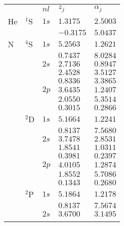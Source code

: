 \begin{table}
\begin{center}
\begin{tabular}{
>{\centering\arraybackslash}p{}
>{\centering\arraybackslash}p{}
>{\centering\arraybackslash}p{}
>{\centering\arraybackslash}p{}
>{\centering\arraybackslash}p{}}
\rowcolor{mydarkgray} 
   &       & $nl$ & $z_j$        & $\alpha_j$   \\
He & $^1$S & $1s$ &  $1.3175$ & $2.5003$  \\\rowcolor{mygray} 
   &       &      & $-0.3175$ & $5.0437$  \\ 
N  & $^4$S & $1s$ & $5.2563$ & $1.2621$  \\\rowcolor{mygray} 
   &       &      & $0.7437$ & $8.0284$  \\ 
   &       & $2s$ & $2.7136$ & $0.8947$ \\\rowcolor{mygray} 
   &       &      & $2.4528$ & $3.5127$  \\
   &       &      & $0.8336$ & $3.3865$  \\ \rowcolor{mygray} 
   &       & $2p$ & $3.6435$ & $1.2407$  \\ 
   &       &      & $2.0550$ & $5.3514$  \\\rowcolor{mygray} 
   &       &      & $0.3015$ & $0.2866$ \\
   & $^2$D & $1s$ & $5.1664$ & $1.2241$  \\\rowcolor{mygray} 
   &       &      & $0.8137$ & $7.5680$  \\ 
   &       & $2s$ & $3.7478$ & $2.8531$  \\\rowcolor{mygray} 
   &       &      & $1.8541$ & $1.0311$  \\ 
   &       &      & $0.3981$ & $0.2397$ \\\rowcolor{mygray} 
   &       & $2p$ & $4.0105$ & $1.2874$  \\ 
   &       &      & $1.8552$ & $5.7086$  \\\rowcolor{mygray} 
   &       &      & $0.1343$ & $0.2680$ \\
   & $^2$P & $1s$ & $5.1864$ & $1.2178$  \\\rowcolor{mygray} 
   &       &      & $0.8137$ & $7.5674$  \\ 
   &       & $2s$ & $3.6700$ & $3.1495$  \\\rowcolor{mygray} 

\end{tabular}
\end{center}
\end{table}
